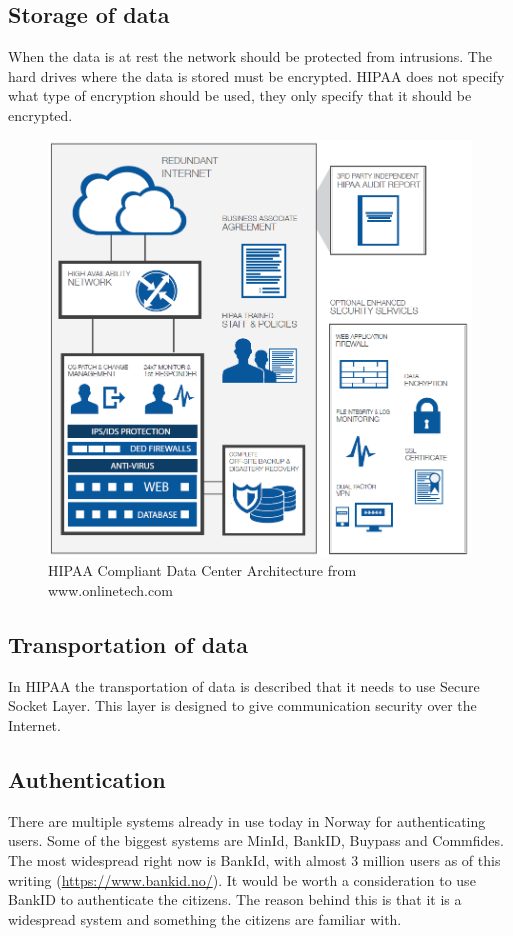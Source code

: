 \subsection{Storage of data}
When the data is at rest the network should be protected from intrusions.
The hard drives where the data is stored must be encrypted. \cite{Encryption}
HIPAA does not specify what type of encryption should be used, they only specify that it should be encrypted.

\begin{figure}[H]
\centering
\includegraphics[scale=0.50]{../Figures/hipaa.png}
\caption{HIPAA Compliant Data Center Architecture from www.onlinetech.com}
\label{figure:HIPAA}
\end{figure}


\subsection{Transportation of data}
In HIPAA the transportation of data is described that it needs to use Secure Socket Layer. 
This layer is designed to give communication security over the Internet. \cite{SSL}


\subsection{Authentication}
There are multiple systems already in use today in Norway for authenticating users. 
Some of the biggest systems are MinId, BankID, Buypass and Commfides.
The most widespread right now is BankId, with almost 3 million users as of this writing (\href{https://www.bankid.no/}{https://www.bankid.no/}).
It would be worth a consideration to use BankID to authenticate the citizens. 
The reason behind this is that it is a widespread system and something the citizens are familiar with. 

